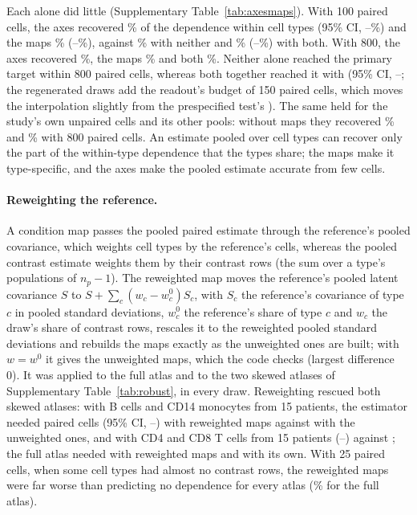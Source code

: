 Each alone did little (Supplementary Table~\ref{tab:axesmaps}). With 100 paired cells, the axes recovered \RvAxesHundred\% of the dependence within cell types (95\% CI, \RvAxesHundredLo--\RvAxesHundredHi\%) and the maps \RvMapOnlyHundred\% (\RvMapOnlyHundredLo--\RvMapOnlyHundredHi\%), against \RvNeitherHundred\% with neither and \RvBothHundred\% (\RvBothHundredLo--\RvBothHundredHi\%) with both. With 800, the axes recovered \RvAxesEight\%, the maps \RvMapOnlyEight\% and both \RvBothEight\%. Neither alone reached the primary target within 800 paired cells, whereas both together reached it with \RvBothCells{} (95\% CI, \RvBothCellsLo--\RvBothCellsHi; the regenerated draws add the readout's budget of 150 paired cells, which moves the interpolation slightly from the prespecified test's \VlCellsAtlas). The same held for the study's own unpaired cells and its other pools: without maps they recovered \RvOwnAxesEight\% and \RvOtherAxesEight\% with 800 paired cells. An estimate pooled over cell types can recover only the part of the within-type dependence that the types share; the maps make it type-specific, and the axes make the pooled estimate accurate from few cells.

\paragraph{Reweighting the reference.} A condition map passes the pooled paired estimate through the reference's pooled covariance, which weights cell types by the reference's cells, whereas the pooled contrast estimate weights them by their contrast rows (the sum over a type's populations of $n_p-1$). The reweighted map moves the reference's pooled latent covariance $S$ to $S+\sum_c(w_c-w^0_c)S_c$, with $S_c$ the reference's covariance of type $c$ in pooled standard deviations, $w^0_c$ the reference's share of type $c$ and $w_c$ the draw's share of contrast rows, rescales it to the reweighted pooled standard deviations and rebuilds the maps exactly as the unweighted ones are built; with $w=w^0$ it gives the unweighted maps, which the code checks (largest difference 0). It was applied to the full atlas and to the two skewed atlases of Supplementary Table~\ref{tab:robust}, in every draw. Reweighting rescued both skewed atlases: with B cells and CD14 monocytes from 15 patients, the estimator needed \RvFewBMonoRwCells{} paired cells (95\% CI, \RvFewBMonoRwCellsLo--\RvFewBMonoRwCellsHi) with reweighted maps against \RvFewBMonoMappedCells{} with the unweighted ones, and with CD4 and CD8 T cells from 15 patients \RvFewTRwCells{} (\RvFewTRwCellsLo--\RvFewTRwCellsHi) against \RvFewTMappedCells; the full atlas needed \RvFullRwCells{} with reweighted maps and \RvBothCells{} with its own. With 25 paired cells, when some cell types had almost no contrast rows, the reweighted maps were far worse than predicting no dependence for every atlas (\RvFullRwTwentyFive\% for the full atlas).

